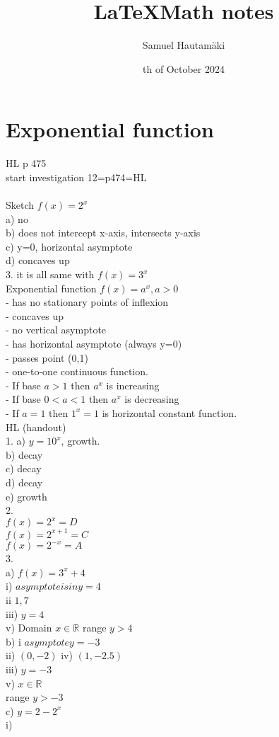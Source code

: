 \documentclass{article}
\title{\LaTeX Math notes}
\author{Samuel Hautamäki}
\date{th of October 2024}
\begin{document}
  \maketitle
   
  \section{Exponential function}
  HL p 475\\
  start investigation 12=p474=HL\\
  \\
  Sketch $f(x)=2^x$\\
  a) no\\
  b) does not intercept x-axis, intersects y-axis\\
  c) y=0, horizontal asymptote\\
  d) concaves up\\
  3. it is all same with $f(x)=3^x$\\
  Exponential function $f(x)=a^x, a>0$\\
  - has no stationary points of inflexion\\
  - concaves up\\
  - no vertical asymptote\\
  - has horizontal asymptote (always y=0)\\
  - passes point (0,1)\\
  - one-to-one continuous function.\\
  - If base $a>1$ then $a^x$ is increasing\\
  - If base $0<a<1$ then $a^x$ is decreasing\\
  - If $a=1$ then $1  ^x=1$ is horizontal constant function.\\
  
  HL (handout)\\
  1. a) $y=10^x$, growth.\\
  b) decay\\
  c) decay\\
  d) decay\\
  e) growth\\
  2. \\
  $f(x)=2^x=D$\\
  $f(x)=2^{x+1}=C$\\
  $f(x)=2^{-x}=A$\\
  3. \\
  a) $f(x)=3^x+4$\\
  i) $asymptote is in y=4$\\
  ii $1,7$\\
  iii) $y=4$\\
  v) Domain $x\in\mathbb{R}$ range $y>4$\\
  b) i $asymptote y=-3$\\
  ii) $(0,-2)$
  iv) $(1,-2.5)$\\
  iii) $y=-3$\\
  v) $x\in\mathbb{R}$\\
  range $y>-3$\\
  c) $y=2-2^x$\\
  i) 
  
  

   
\end{document}
